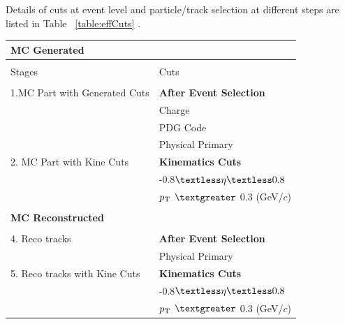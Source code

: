 \newpage
Details of cuts at event level and particle/track selection at different steps are listed in Table ~\ref{table:effCuts} . \\
\begin{table}[h]
\small
\centering %

\begin{tabular}{  p{5cm} |  p{8.5cm} }
 \\
  \multirow{1}{*}{\large \textbf {MC Generated }} \\
\hline
\\
     Stages         &              Cuts \\
\hline\hline & \\		            	
  1.MC Part with Generated Cuts         &    {\textbf {After Event Selection}}\\
																		   & Charge\\
																		    & PDG Code\\
														  				  & Physical Primary \\

   2. MC Part with Kine Cuts         &              {\textbf {Kinematics Cuts }}\\
															    & -0.8$\textless \eta \textless  0.8$\\
															    & $p_{\rm T}$ $\textgreater$ 0.3 (GeV/$c$)\\

&		\\            	


\multirow{1}{*}{\large \textbf {MC Reconstructed }} & \\
\hline


\hline & \\		            	                        	
4. Reco tracks        &                             {\textbf {After Event Selection}}\\
															   & Physical Primary \\
															
															
5. Reco tracks with Kine Cuts         &               {\textbf  {Kinematics Cuts }}\\
															    & -0.8$\textless \eta \textless  0.8$\\
															    & $p_{\rm T}$ $\textgreater$ 0.3 (GeV/$c$)\\




\end{tabular}
\end{table}
